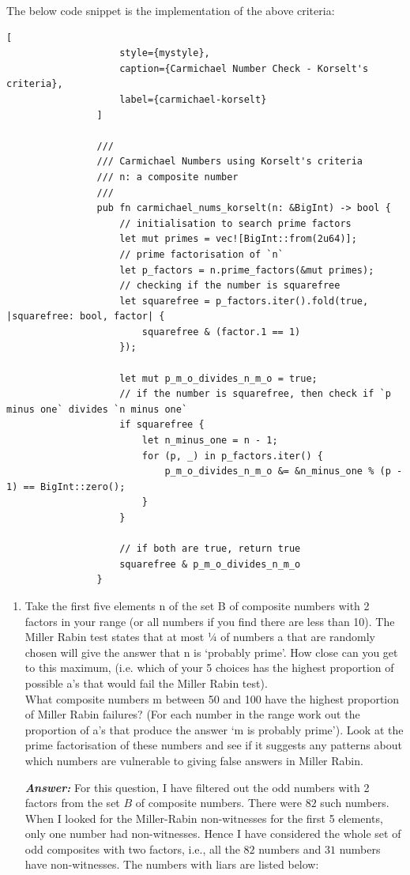 \documentclass[11pt,a4paper]{article}
\begin{document}
\begin{enumerate}[1.]
\begin{enumerate}[2.]
\begin{flushleft}
\begin{enumerate}[(a)]
			The below code snippet is the implementation of the above criteria:
			
			\begin{lstlisting}[
					style={mystyle},
					caption={Carmichael Number Check - Korselt's criteria},
					label={carmichael-korselt}
				]
				
				///
				/// Carmichael Numbers using Korselt's criteria
				/// n: a composite number
				///
				pub fn carmichael_nums_korselt(n: &BigInt) -> bool {
					// initialisation to search prime factors
					let mut primes = vec![BigInt::from(2u64)];
					// prime factorisation of `n`
					let p_factors = n.prime_factors(&mut primes);
					// checking if the number is squarefree
					let squarefree = p_factors.iter().fold(true, |squarefree: bool, factor| {
						squarefree & (factor.1 == 1)
					});
					
					let mut p_m_o_divides_n_m_o = true;
					// if the number is squarefree, then check if `p minus one` divides `n minus one`
					if squarefree {
						let n_minus_one = n - 1;
						for (p, _) in p_factors.iter() {
							p_m_o_divides_n_m_o &= &n_minus_one % (p - 1) == BigInt::zero();
						}
					}
					
					// if both are true, return true
					squarefree & p_m_o_divides_n_m_o
				}
			\end{lstlisting}
			\end{enumerate}
		\end{flushleft}
	\end{enumerate}
	\begin{enumerate}[3.]
		\item Take the first five elements n of the set B of composite numbers with 2 factors in your range (or all numbers if you find there are less than 10). The Miller Rabin test states that at most ¼ of numbers a that are randomly chosen will give the answer that n is ‘probably prime’. How close can you get to this maximum, (i.e. which of your 5 choices has the highest proportion of possible a’s that would fail the Miller Rabin test). \\
		\smallbreak
		What composite numbers m between 50 and 100 have the highest proportion of Miller Rabin failures? (For each number in the range work out the proportion of a’s that produce the answer ‘m is probably prime’). Look at the prime factorisation of these numbers and see if it suggests any patterns about which numbers are vulnerable to giving false answers in Miller Rabin. 

		\begin{flushleft}
			\textbf{\textit{Answer:}} For this question, I have filtered out the odd numbers with 2 factors from the set $B$ of composite numbers. There were $82$ such numbers. When I looked for the Miller-Rabin non-witnesses for the first 5 elements, only one number had non-witnesses. Hence I have considered the whole set of odd composites with two factors, i.e., all the $82$ numbers and $31$ numbers have non-witnesses. The numbers with liars are listed below:


\end{flushleft}
\end{enumerate}
\end{enumerate}
\end{document}
